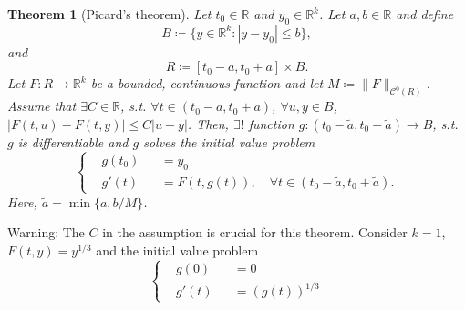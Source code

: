 \documentclass[12pt]{article}
\theoremstyle{plain}
\newtheorem{thm}{Theorem}
\theoremstyle{definition}
\begin{document}
\begin{thm}[Picard's theorem]
    Let $t_0\in\mathbb{R}$ and $y_0\in\mathbb{R}^k$.
    Let $a, b\in\mathbb{R}$ and define 
    $$B\coloneqq\{y\in\mathbb{R}^k:|y-y_0|\leq b\},$$
    and
    $$R\coloneqq [t_0-a,t_0+a]\times B.$$
    Let $F:R\rightarrow\mathbb{R}^k$ be a bounded, continuous function and let
    $M\coloneqq \|F\|_{\mathcal{C}^0(R)}$.
    Assume that $\exists C\in\mathbb{R}$, s.t. $\forall t\in(t_0-a,t_0+a)$,
    $\forall u,y\in B$, $|F(t,u)-F(t,y)|\leq C|u-y|$.
    Then, $\exists! $ function
    $g:(t_0-\tilde{a},t_0+\tilde{a})\rightarrow B$, s.t.
    $g$ is differentiable and $g$ solves the initial value problem
    $$\left\{
        \begin{aligned}
            &g(t_0)&&=y_0\\
            &g'(t)&&=F(t,g(t)),\quad\forall t\in(t_0-\tilde{a},t_0+\tilde{a}).
        \end{aligned}
    \right.$$
    Here, $\tilde{a}=\min\{a,b/M\}$.
\end{thm}
    Warning: The $C$ in the assumption is crucial for this theorem.
    Consider $k=1$, $F(t,y)=y^{1/3}$ and the initial value problem
    $$\left\{
        \begin{aligned}
            &g(0)&&=0\\
            &g'(t)&&=(g(t))^{1/3}
        \end{aligned}
    \right.$$
\end{document}
